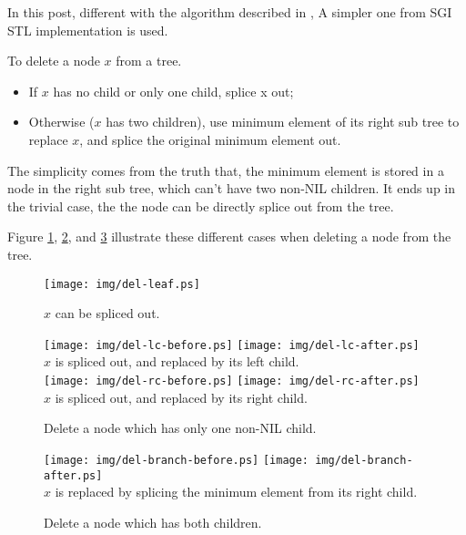 \documentclass{article}
\begin{document}
In this post, different with the algorithm described in \cite{CLRS}, 
A simpler one from SGI STL implementation is used.\cite{sgi-stl}

To delete a node $x$ from a tree.
\begin{itemize}
\item If $x$ has no child or only one child, splice x out;
\item Otherwise ($x$ has two children), use minimum element of its right sub tree to replace $x$, and splice the original minimum element out.
\end{itemize}

The simplicity comes from the truth that, the minimum element is stored
in a node in the right sub tree, which can't have two non-NIL children.
It ends up in the trivial case, the the node can be directly splice
out from the tree.

Figure \ref{fig:del-leaf}, \ref{fig:del-1child}, and \ref{fig:del-branch}
illustrate these different cases when deleting a node from the tree.

\begin{figure}[htbp]
       \begin{center}
	\texttt{[image: img/del-leaf.ps]}
        \caption{$x$ can be spliced out.} \label{fig:del-leaf}
       \end{center}
\end{figure}

\begin{figure}[htbp]
        \begin{center}
        \texttt{[image: img/del-lc-before.ps]} \texttt{[image: img/del-lc-after.ps]} \\
        $x$ is spliced out, and replaced by its left child. \\
        \texttt{[image: img/del-rc-before.ps]} \texttt{[image: img/del-rc-after.ps]} \\
        $x$ is spliced out, and replaced by its right child.
        \caption{Delete a node which has only one non-NIL child.} \label{fig:del-1child}
        \end{center}
\end{figure}

\begin{figure}[htbp]
        \begin{center}
        \texttt{[image: img/del-branch-before.ps]} \texttt{[image: img/del-branch-after.ps]} \\
        $x$ is replaced by splicing the minimum element from its right child.
        \caption{Delete a node which has both children.} \label{fig:del-branch}
       \end{center}
\end{figure}
\end{document}

